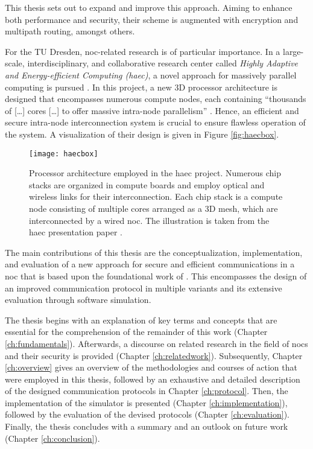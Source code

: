 This thesis sets out to expand and improve this approach. Aiming to enhance both performance and security, their scheme is augmented with
encryption and multipath routing, amongst others.

For the TU Dresden, \gls{noc}-related research is of particular importance. In a large-scale, interdisciplinary, and collaborative research center
called \textit{Highly Adaptive and Energy-efficient Computing (\gls{haec})}, a novel approach for massively parallel computing is pursued
\cite{matthiesen17haec}. In this project, a new 3D processor architecture is designed that encompasses numerous compute nodes, each containing
\enquote{thousands of […] cores […] to offer massive intra-node parallelism} \cite[1]{matthiesen17haec}. Hence, an efficient and secure intra-node
interconnection system is crucial to ensure flawless operation of the system. A visualization of their design is given in Figure \vref{fig:haecbox}.

\begin{figure}
    \centering
    \texttt{[image: haecbox]}
    \caption[Processor architecture used in the HAEC project]{Processor architecture employed in the \gls{haec} project. Numerous chip stacks are organized
    in compute boards and employ optical and wireless links for their interconnection. Each chip stack is a compute node consisting of multiple
    cores arranged as a 3D mesh, which are interconnected by a wired \gls{noc}. The illustration is taken from the \gls{haec} presentation paper
    \cite[1]{matthiesen17haec}.}
    \label{fig:haecbox}
\end{figure}

The main contributions of this thesis are the conceptualization, implementation, and evaluation of a new approach for secure and efficient
communications in a \gls{noc} that is based upon the foundational work of \citeauthor{moriam18activeattackers}
\cites{moriam15manycorenc}{moriam18activeattackers}. This encompasses the design of an improved communication protocol in multiple variants and its
extensive evaluation through software simulation.

The thesis begins with an explanation of key terms and concepts that are essential for the comprehension of the remainder of this work (Chapter
\ref{ch:fundamentals}). Afterwards, a discourse on related research in the field of \glspl{noc} and their security is provided (Chapter
\ref{ch:relatedwork}). Subsequently, Chapter \ref{ch:overview} gives an overview of the methodologies and courses of action that were employed in this
thesis, followed by an exhaustive and detailed description of the designed communication protocols in Chapter \ref{ch:protocol}. Then, the
implementation of the simulator is presented (Chapter \ref{ch:implementation}), followed by the evaluation of the devised protocols (Chapter
\ref{ch:evaluation}). Finally, the thesis concludes with a summary and an outlook on future work (Chapter \ref{ch:conclusion}).
